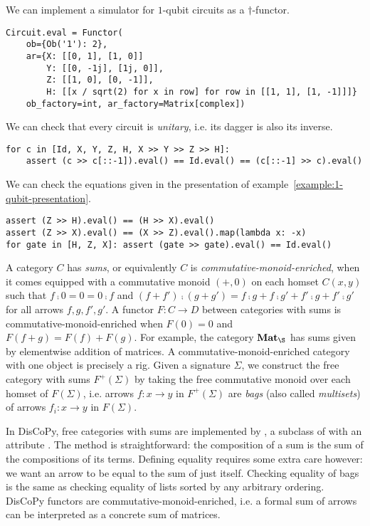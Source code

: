 \begin{example}
We can implement a simulator for $1$-qubit circuits as a $\dagger$-functor.
\begin{verbatim}
Circuit.eval = Functor(
    ob={Ob('1'): 2},
    ar={X: [[0, 1], [1, 0]]
        Y: [[0, -1j], [1j, 0]],
        Z: [[1, 0], [0, -1]],
        H: [[x / sqrt(2) for x in row] for row in [[1, 1], [1, -1]]]}
    ob_factory=int, ar_factory=Matrix[complex])
\end{verbatim}
We can check that every circuit is \emph{unitary}, i.e. its dagger is also its inverse.
\begin{verbatim}
for c in [Id, X, Y, Z, H, X >> Y >> Z >> H]:
    assert (c >> c[::-1]).eval() == Id.eval() == (c[::-1] >> c).eval()
\end{verbatim}
We can check the equations given in the presentation of example~\ref{example:1-qubit-presentation}.
\begin{verbatim}
assert (Z >> H).eval() == (H >> X).eval()
assert (Z >> X).eval() == (X >> Z).eval().map(lambda x: -x)
for gate in [H, Z, X]: assert (gate >> gate).eval() == Id.eval()
\end{verbatim}
\end{example}

A category $C$ has \emph{sums}, or equivalently $C$ is \emph{commutative-monoid-enriched}, when it comes equipped with a commutative monoid $(+, 0)$ on each homset $C(x, y)$ such that $f \fcmp 0 = 0 = 0 \fcmp f$ and $(f + f') \fcmp (g + g') = f \fcmp g + f \fcmp g' + f' \fcmp g + f' \fcmp g'$ for all arrows $f, g, f', g'$.
A functor $F : C \to D$ between categories with sums is commutative-monoid-enriched when $F(0) = 0$ and $F(f + g) = F(f) + F(g)$.
For example, the category $\mathbf{Mat}_\S$ has sums given by elementwise addition of matrices.
A commutative-monoid-enriched category with one object is precisely a rig.
Given a signature $\Sigma$, we construct the free category with sums $F^+(\Sigma)$ by taking the free commutative monoid over each homset of $F(\Sigma)$, i.e. arrows $f : x \to y$ in $F^+(\Sigma)$ are \emph{bags} (also called \emph{multisets}) of arrows $f_i : x \to y$ in $F(\Sigma)$.

In DisCoPy, free categories with sums are implemented by , a subclass of  with an attribute .
The method  is straightforward: the composition of a sum is the sum of the compositions of its terms.
Defining equality requires some extra care however: we want an arrow to be equal to the sum of just itself.
Checking equality of bags is the same as checking equality of lists sorted by any arbitrary ordering.
DisCoPy functors are commutative-monoid-enriched, i.e. a formal sum of arrows can be interpreted as a concrete sum of matrices.

